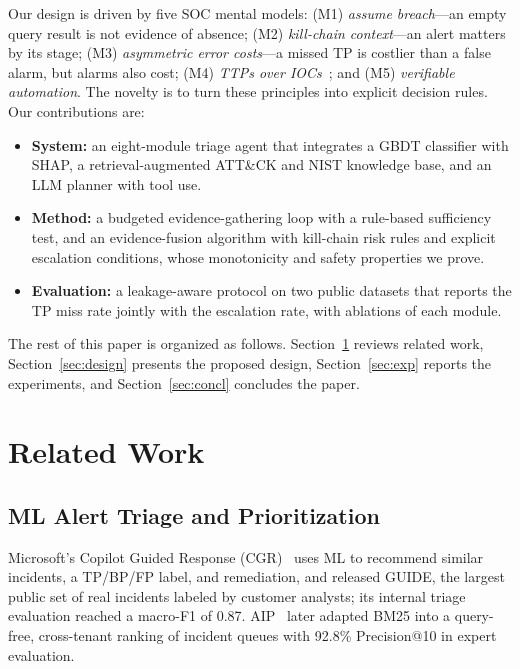 \documentclass[conference]{IEEEtran}
\begin{document}
Our design is driven by five SOC mental models: (M1) \emph{assume
breach}---an empty query result is not evidence of absence;
(M2) \emph{kill-chain context}---an alert matters by its stage;
(M3) \emph{asymmetric error costs}---a missed TP is costlier than a
false alarm, but alarms also cost; (M4) \emph{TTPs over
IOCs}~\cite{bianco2013}; and (M5) \emph{verifiable automation}. The
novelty is to turn these principles into explicit decision rules. Our
contributions are:
\begin{itemize}
\item \textbf{System:} an eight-module triage agent that integrates a
GBDT classifier with SHAP, a retrieval-augmented ATT\&CK and NIST
knowledge base, and an LLM planner with tool use.
\item \textbf{Method:} a budgeted evidence-gathering loop with a
rule-based sufficiency test, and an evidence-fusion algorithm with
kill-chain risk rules and explicit escalation conditions, whose
monotonicity and safety properties we prove.
\item \textbf{Evaluation:} a leakage-aware protocol on two public
datasets that reports the TP miss rate jointly with the escalation
rate, with ablations of each module.
\end{itemize}

The rest of this paper is organized as follows.
Section~\ref{sec:related} reviews related work,
Section~\ref{sec:design} presents the proposed design,
Section~\ref{sec:exp} reports the experiments, and
Section~\ref{sec:concl} concludes the paper.

\section{Related Work}\label{sec:related}

\subsection{ML Alert Triage and Prioritization}
Microsoft's Copilot Guided Response (CGR)~\cite{freitas2024cgr} uses ML
to recommend similar incidents, a TP/BP/FP label, and remediation, and
released GUIDE, the largest public set of real incidents labeled by
customer analysts; its internal triage evaluation reached a macro-F1
of 0.87. AIP~\cite{freitas2026aip} later adapted BM25 into a
query-free, cross-tenant ranking of incident queues with 92.8\%
Precision@10 in expert evaluation.
\end{document}
